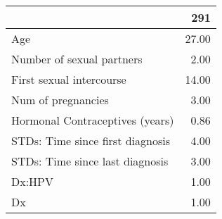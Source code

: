 \begin{tabular}{lr}
\toprule
{} &    291 \\
\midrule
Age                              &  27.00 \\
Number of sexual partners        &   2.00 \\
First sexual intercourse         &  14.00 \\
Num of pregnancies               &   3.00 \\
Hormonal Contraceptives (years)  &   0.86 \\
STDs: Time since first diagnosis &   4.00 \\
STDs: Time since last diagnosis  &   3.00 \\
Dx:HPV                           &   1.00 \\
Dx                               &   1.00 \\
\bottomrule
\end{tabular}
